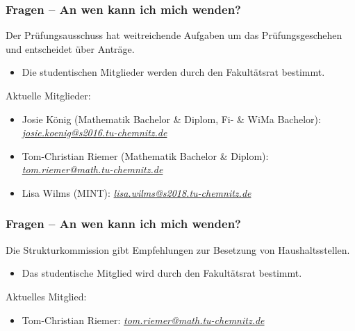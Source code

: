 \documentclass[10pt]{beamer}
\begin{document}
\begin{frame}
	\frametitle{Fragen -- An wen kann ich mich wenden?}

	\begin{block}{\vphantom{X}}
		Der Prüfungsausschuss hat weitreichende Aufgaben um das Prüfungsgeschehen und entscheidet über Anträge.
	\end{block}

	\begin{itemize}
		\item Die studentischen Mitglieder werden durch den Fakultätsrat bestimmt.
	\end{itemize}

	Aktuelle Mitglieder:

	\begin{itemize}
		\item Josie König (Mathematik Bachelor \& Diplom, Fi- \& WiMa Bachelor): \textit{\href{mailto:josie.koenig@s2016.tu-chemnitz.de}{josie.koenig@s2016.tu-chemnitz.de}}
		\item Tom-Christian Riemer (Mathematik Bachelor \& Diplom): \textit{\href{mailto:tom.riemer@math.tu-chemnitz.de}{tom.riemer@math.tu-chemnitz.de}}
		\item Lisa Wilms (MINT): \textit{\href{mailto:lisa.wilms@s2018.tu-chemnitz.de}{lisa.wilms@s2018.tu-chemnitz.de}}
	\end{itemize}
\end{frame}

\begin{frame}
	\frametitle{Fragen -- An wen kann ich mich wenden?}

	\begin{block}{\vphantom{X}}
		Die Strukturkommission gibt Empfehlungen zur Besetzung von Haushaltsstellen.
	\end{block}

	\begin{itemize}
		\item Das studentische Mitglied wird durch den Fakultätsrat bestimmt.
	\end{itemize}

	Aktuelles Mitglied:

	\begin{itemize}
		\item Tom-Christian Riemer: \textit{\href{mailto:tom.riemer@math.tu-chemnitz.de}{tom.riemer@math.tu-chemnitz.de}}
	\end{itemize}
\end{frame}
\end{document}
